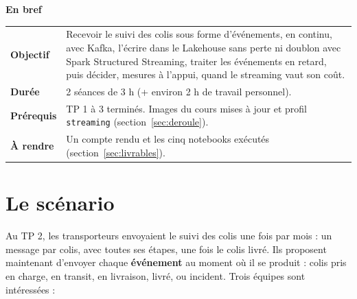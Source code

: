 \documentclass[11pt,a4paper]{article}
\newcommand{\cmd}[1]{\texttt{#1}}
\begin{document}

\thispagestyle{empty}
\vspace*{4.2cm}

{\large\bfseries\color{lhblue}En bref}\par\smallskip
\begin{tabularx}{\linewidth}{@{}>{\bfseries}l X@{}}
\toprule
Objectif & Recevoir le suivi des colis sous forme d'événements, en continu, avec Kafka, l'écrire dans
           le Lakehouse sans perte ni doublon avec Spark Structured Streaming, traiter les événements
           en retard, puis décider, mesures à l'appui, quand le streaming vaut son coût. \\
Durée    & 2 séances de 3 h (+ environ 2 h de travail personnel). \\
Prérequis & TP 1 à 3 terminés. Images du cours mises à jour et profil \cmd{streaming}
            (section~\ref{sec:deroule}). \\
À rendre & Un compte rendu et les cinq notebooks exécutés (section~\ref{sec:livrables}). \\
\bottomrule
\end{tabularx}

\section{Le scénario}

Au TP 2, les transporteurs envoyaient le suivi des colis une fois par mois : un message par colis,
avec toutes ses étapes, une fois le colis livré. Ils proposent maintenant d'envoyer chaque
\textbf{événement} au moment où il se produit : colis pris en charge, en transit, en livraison,
livré, ou incident. Trois équipes sont intéressées :
\end{document}
